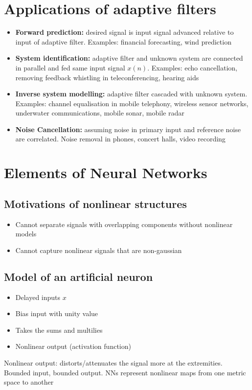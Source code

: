 \section{Applications of adaptive filters}
\begin{itemize}
    \item \textbf{Forward prediction: } desired signal is input signal advanced relative to input of adaptive filter. Examples: financial forecasting, wind prediction
    \item \textbf{System identification: } adaptive filter and unknown system are connected in parallel and fed same input signal $x(n)$. Examples: echo cancellation, removing feedback whistling in teleconferencing, hearing aids
    \item \textbf{Inverse system modelling: } adaptive filter cascaded with unknown system. Examples: channel equalisation in mobile telephony, wireless sensor networks, underwater communications, mobile sonar, mobile radar
    \item \textbf{Noise Cancellation: } assuming noise in primary input and reference noise are correlated. Noise removal in phones, concert halls, video recording
\end{itemize}


\section{Elements of Neural Networks}
\subsection{Motivations of nonlinear structures}
\begin{itemize}
    \item Cannot separate signals with overlapping components without nonlinear models
    \item Cannot capture nonlinear signals that are non-gaussian
\end{itemize}

\subsection{Model of an artificial neuron}
\begin{itemize}
    \item Delayed inputs $x$
    \item Bias input with unity value
    \item Takes the sums and multilies
    \item Nonlinear output (activation function)
\end{itemize}
Nonlinear output: distorts/attenuates the signal more at the extremities.
Bounded input, bounded output.
NNs represent nonlinear maps from one metric space to another


